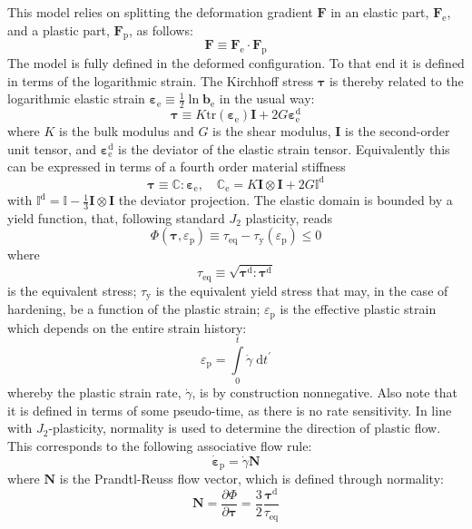 \documentclass{goose-article}
\newcommand\T[1]{\bm{{#1}}}
\newcommand\TT[1]{\mathbb{{#1}}}
\begin{document}
This model relies on splitting the deformation gradient $\T{F}$ in an elastic part, $\T{F}_\mathrm{e}$, and a plastic part, $\T{F}_\mathrm{p}$, as follows:
\begin{equation}
  \T{F} \equiv \T{F}_\mathrm{e} \cdot \T{F}_\mathrm{p}
\end{equation}
The model is fully defined in the deformed configuration. To that end it is defined in terms of the logarithmic strain. The Kirchhoff stress $\T{\tau}$ is thereby related to the logarithmic elastic strain $\T{\varepsilon}_\mathrm{e} \equiv \tfrac{1}{2} \ln \T{b}_\mathrm{e}$ in the usual way:
\begin{equation}
  \T{\tau} \equiv K \mathrm{tr} \left( \T{\varepsilon}_\mathrm{e} \right) \T{I} + 2 G \T{\varepsilon}_\mathrm{e}^\mathrm{d}
\end{equation}
where $K$ is the bulk modulus and $G$ is the shear modulus, $\T{I}$ is the second-order unit tensor, and $\T{\varepsilon}_\mathrm{e}^\mathrm{d}$ is the deviator of the elastic strain tensor. Equivalently this can be expressed in terms of a fourth order material stiffness
\begin{equation}
  \T{\tau} \equiv \TT{C} : \T{\varepsilon}_\mathrm{e},
  \quad
  \TT{C}_\mathrm{e} = K \T{I} \otimes \T{I} + 2 G \TT{I}^\mathrm{d}
  \label{eq:tangent:elas}
\end{equation}
with $\TT{I}^\mathrm{d} = \TT{I} - \tfrac{1}{3} \T{I} \otimes \T{I}$ the deviator projection. The elastic domain is bounded by a yield function, that, following standard $J_2$ plasticity, reads
\begin{equation}
  \Phi(\T{\tau}, \varepsilon_\mathrm{p}) \equiv \tau_\mathrm{eq} - \tau_\mathrm{y}(\varepsilon_\mathrm{p}) \leq 0
\end{equation}
where
\begin{equation}
  \tau_\mathrm{eq} \equiv \sqrt{ \T{\tau}^\mathrm{d} : \T{\tau}^\mathrm{d} }
\end{equation}
is the equivalent stress; $\tau_\mathrm{y}$ is the equivalent yield stress that may, in the case of hardening, be a function of the plastic strain; $\varepsilon_\mathrm{p}$ is the effective plastic strain which depends on the entire strain history:
\begin{equation}
  \varepsilon_\mathrm{p} = \int\limits_0^t \dot{\gamma} \;\mathrm{d}t^\prime
  \label{eq:history}
\end{equation}
whereby the plastic strain rate, $\dot{\gamma}$, is by construction nonnegative. Also note that it is defined in terms of some pseudo-time, as there is no rate sensitivity. In line with $J_2$-plasticity, normality is used to determine the direction of plastic flow. This corresponds to the following associative flow rule:
\begin{equation}
  \dot{\bm{\varepsilon}}_\mathrm{p} = \dot{\gamma} \bm{N}
  \label{eq:flow-rule}
\end{equation}
where $\bm{N}$ is the Prandtl-Reuss flow vector, which is defined through normality:
\begin{equation}
  \bm{N}
  = \frac{\partial \Phi}{\partial \T{\tau}}
  = \frac{3}{2} \frac{\T{\tau}^\mathrm{d}}{\tau_\mathrm{eq}}
\end{equation}
\end{document}
